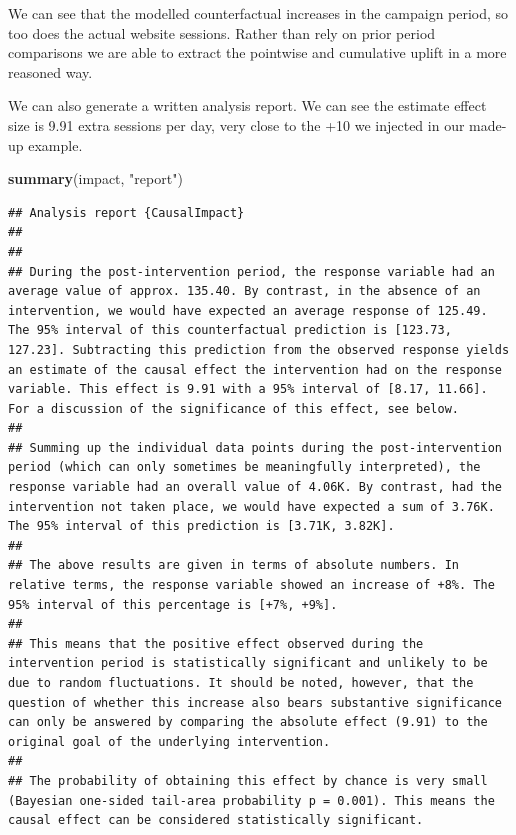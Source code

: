 \documentclass[]{book}
\newenvironment{Shaded}{\begin{snugshade}}{\end{snugshade}}
\newcommand{\KeywordTok}[1]{\textcolor[rgb]{0.13,0.29,0.53}{\textbf{#1}}}
\newcommand{\StringTok}[1]{\textcolor[rgb]{0.31,0.60,0.02}{#1}}
\newcommand{\NormalTok}[1]{#1}
\begin{document}
We can see that the modelled counterfactual increases in the campaign
period, so too does the actual website sessions. Rather than rely on
prior period comparisons we are able to extract the pointwise and
cumulative uplift in a more reasoned way.

We can also generate a written analysis report. We can see the estimate
effect size is 9.91 extra sessions per day, very close to the +10 we
injected in our made-up example.

\begin{Shaded}
\begin{Highlighting}[]
\KeywordTok{summary}\NormalTok{(impact, }\StringTok{"report"}\NormalTok{)}
\end{Highlighting}
\end{Shaded}

\begin{verbatim}
## Analysis report {CausalImpact}
## 
## 
## During the post-intervention period, the response variable had an average value of approx. 135.40. By contrast, in the absence of an intervention, we would have expected an average response of 125.49. The 95% interval of this counterfactual prediction is [123.73, 127.23]. Subtracting this prediction from the observed response yields an estimate of the causal effect the intervention had on the response variable. This effect is 9.91 with a 95% interval of [8.17, 11.66]. For a discussion of the significance of this effect, see below.
## 
## Summing up the individual data points during the post-intervention period (which can only sometimes be meaningfully interpreted), the response variable had an overall value of 4.06K. By contrast, had the intervention not taken place, we would have expected a sum of 3.76K. The 95% interval of this prediction is [3.71K, 3.82K].
## 
## The above results are given in terms of absolute numbers. In relative terms, the response variable showed an increase of +8%. The 95% interval of this percentage is [+7%, +9%].
## 
## This means that the positive effect observed during the intervention period is statistically significant and unlikely to be due to random fluctuations. It should be noted, however, that the question of whether this increase also bears substantive significance can only be answered by comparing the absolute effect (9.91) to the original goal of the underlying intervention.
## 
## The probability of obtaining this effect by chance is very small (Bayesian one-sided tail-area probability p = 0.001). This means the causal effect can be considered statistically significant.
\end{verbatim}
\end{document}
